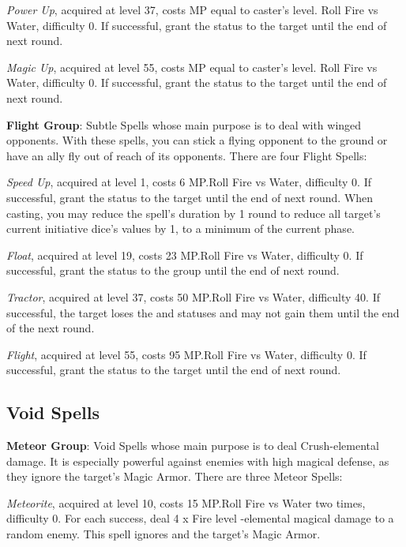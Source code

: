 \begin{multicols}{2}
    \textit{Power Up}, acquired at level 37, costs MP equal to caster's level. Roll Fire vs Water, difficulty 0. If successful, grant the  status to the target until the end of next round.
    
    \textit{Magic Up}, acquired at level 55, costs MP equal to caster's level. Roll Fire vs Water, difficulty 0. If successful, grant the  status to the target until the end of next round.
    
    \textbf{Flight Group}: Subtle Spells whose main purpose is to deal with winged opponents. With these spells, you can stick a flying opponent to the ground or have an ally fly out of reach of its opponents. There are four Flight Spells:
    
    \textit{Speed Up}, acquired at level 1, costs 6 MP.\@{}Roll Fire vs Water, difficulty 0. If successful, grant the  status to the target until the end of next round. When casting, you may reduce the spell's duration by 1 round to reduce all target's current initiative dice's values by 1, to a minimum of the current phase.
    
    \textit{Float}, acquired at level 19, costs 23 MP.\@{}Roll Fire vs Water, difficulty 0. If successful, grant the  status to the group until the end of next round.
    
    \textit{Tractor}, acquired at level 37, costs 50 MP.\@{}Roll Fire vs Water, difficulty 40. If successful, the target loses the  and  statuses and may not gain them until the end of the next round.
    
    \textit{Flight}, acquired at level 55, costs 95 MP.\@{}Roll Fire vs Water, difficulty 0. If successful, grant the  status to the target until the end of next round.
    
    \subsection{Void Spells}\label{subsec:time-void}

    \textbf{Meteor Group}: Void Spells whose main purpose is to deal Crush-elemental damage. It is especially powerful against enemies with high magical defense, as they ignore the target’s Magic Armor. There are three Meteor Spells:
    
    \textit{Meteorite}, acquired at level 10, costs 15 MP.\@{}Roll Fire vs Water two times, difficulty 0. For each success, deal 4 x Fire level -elemental magical damage to a random enemy. This spell ignores  and the target’s Magic Armor.
    

\end{multicols}
